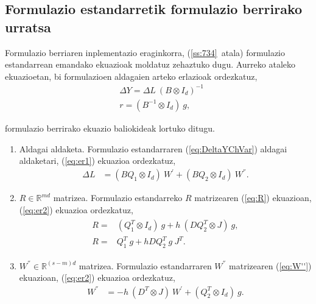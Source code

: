\subsection*{Formulazio estandarretik formulazio berrirako urratsa}

Formulazio berriaren inplementazio eraginkorra, (\ref{ss:734}~atala) formulazio estandarrean emandako ekuazioak  moldatuz zehaztuko dugu.
Aurreko ataleko ekuazioetan, bi formulazioen aldagaien arteko erlazioak ordezkatuz,
\begin{align}
\label{eq:er1}
&\Delta Y = \Delta L \ (B \otimes I_d)^{-1} \\ 
\label{eq:er2}
&r=(B^{-1} \otimes I_d) \ g,
\end{align}

formulazio berrirako  ekuazio baliokideak lortuko ditugu.
\begin{enumerate}

\item Aldagai aldaketa.
Formulazio estandarraren (\ref{eq:DeltaYChVar}) aldagai aldaketari, (\ref{eq:er1}) ekuazioa ordezkatuz,
\begin{align}
\Delta L &=(B Q_1 \otimes I_d) \ W^{'}+(B Q_2 \otimes I_d) \ W^{''}.
\end{align}

\item $R\in \mathbb{R}^{md}$ matrizea.
Formulazio estandarreko $R$ matrizearen (\ref{eq:R}) ekuazioan, (\ref{eq:er2}) ekuazioa ordezkatuz,
\begin{align}
\begin{split}
R=&(Q_1^T \otimes I_d) \ g + h \ (D Q_2^T \otimes J) \ g,  \\
R=& Q_1^T \ g  + h D Q_2^T \ g \ J^T.
\end{split}
\end{align}

\item $W^{''}\in \mathbb{R}^{(s-m)d}$ matrizea.
Formulazio estandarraren $W^{''}$ matrizearen (\ref{eq:W''}) ekuazioan, (\ref{eq:er2}) ekuazioa ordezkatuz,
\begin{align}
W^{''}&= -h \ (D^T \otimes J) \ W^{'}+ (Q_2^T \otimes I_d) \ g.
\end{align}


\end{enumerate}


